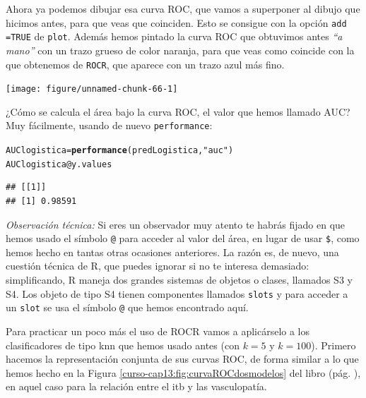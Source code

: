 \documentclass[10pt,a4paper]{article}\usepackage[]{graphicx}\usepackage[]{color}
\makeatletter
\newcommand{\hlstr}[1]{\textcolor[rgb]{0.192,0.494,0.8}{#1}}%
\newcommand{\hlopt}[1]{\textcolor[rgb]{0,0,0}{#1}}%
\newcommand{\hlstd}[1]{\textcolor[rgb]{0.345,0.345,0.345}{#1}}%
\newcommand{\hlkwb}[1]{\textcolor[rgb]{0.69,0.353,0.396}{#1}}%
\newcommand{\hlkwc}[1]{\textcolor[rgb]{0.333,0.667,0.333}{#1}}%
\newcommand{\hlkwd}[1]{\textcolor[rgb]{0.737,0.353,0.396}{\textbf{#1}}}%
\newenvironment{kframe}{%
 \def\at@end@of@kframe{}%
 \ifinner\ifhmode%
  \def\at@end@of@kframe{\end{minipage}}%
  \begin{minipage}{\columnwidth}%
 \fi\fi%
 \def\FrameCommand##1{\hskip\@totalleftmargin \hskip-\fboxsep
 \colorbox{shadecolor}{##1}\hskip-\fboxsep
     \hskip-\linewidth \hskip-\@totalleftmargin \hskip\columnwidth}%
 \MakeFramed {\advance\hsize-\width
   \@totalleftmargin\z@ \linewidth\hsize
   \@setminipage}}%
 {\par\unskip\endMakeFramed%
 \at@end@of@kframe}
\newenvironment{knitrout}{}{} %
\newcounter {cont01}
\makeatother
\begin{document}
Ahora ya podemos dibujar esa curva ROC, que vamos a superponer al dibujo que hicimos antes, para que veas que coinciden. Esto se consigue con la opción {\tt add =TRUE} de {\tt plot}. Además hemos pintado la curva ROC que obtuvimos antes {\em ``a mano''} con un trazo grueso de color naranja, para que veas como coincide con la que obtenemos de {\tt ROCR}, que aparece con un trazo azul más fino.

\begin{knitrout}
\color{fgcolor}

{\centering \texttt{[image: figure/unnamed-chunk-66-1]} 

}



\end{knitrout}

¿Cómo se calcula el área bajo la curva ROC, el valor que hemos llamado AUC? Muy fácilmente, usando de nuevo {\tt performance}:

\begin{knitrout}
\color{fgcolor}\begin{kframe}
\begin{alltt}
\hlstd{AUClogistica} \hlkwb{=} \hlkwd{performance}\hlstd{(predLogistica,}\hlstr{"auc"}\hlstd{)}
\hlstd{AUClogistica}\hlopt{@}\hlkwc{y.values}
\end{alltt}
\begin{verbatim}
## [[1]]
## [1] 0.98591
\end{verbatim}
\end{kframe}
\end{knitrout}

{\em Observación técnica:}  Si eres un observador muy atento te habrás fijado en que hemos usado el símbolo \verb#@# para acceder al valor del área, en lugar de usar \verb#$#, como hemos hecho en tantas otras ocasiones anteriores. La razón es, de nuevo, una cuestión técnica de R, que puedes ignorar si no te interesa demasiado: simplificando, R maneja dos grandes sistemas de objetos o clases, llamados S3 y S4. Los objeto de tipo S4 tienen componentes llamados {\tt slots} y para acceder a un {\tt slot} se usa el símbolo \verb#@# que hemos encontrado aquí.

Para practicar un poco más el uso de ROCR vamos a aplicárselo a los clasificadores de tipo knn que hemos usado antes (con $k=5$ y $k=100$). Primero hacemos la representación conjunta de sus curvas ROC, de forma similar a lo que hemos hecho en la Figura \ref{curso-cap13:fig:curvaROCdosmodelos} del libro (pág. \pageref{curso-cap13:fig:curvaROCdosmodelos}), en aquel caso para la relación entre el itb y las vasculopatía.
\end{document}
